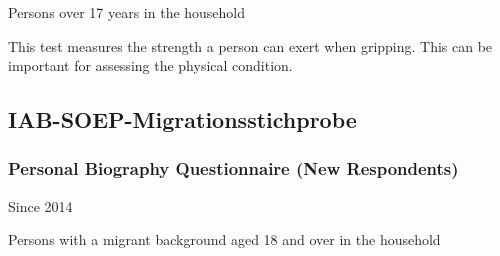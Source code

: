 \documentclass[letterpaper,10pt,openany,onesideH,english]{sphinxmanual}
\begin{document}
 Persons over 17 years in the household


This test measures the strength a person can exert when gripping. This can be important for assessing the physical condition.


\subsection{IAB-SOEP-Migrationsstichprobe}
\label{\detokenize{Contents of SOEPcore/index:iab-soep-migrationsstichprobe}}

\subsubsection{Personal Biography Questionnaire (New Respondents)}
\label{\detokenize{Contents of SOEPcore/index:personal-biography-questionnaire-new-respondents}}
 Since 2014

 Persons with a migrant background aged 18 and over in the household
\end{document}
